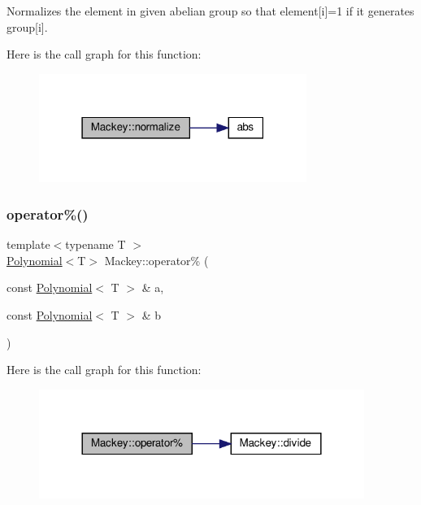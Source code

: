 Normalizes the element in given abelian group so that element\mbox{[}i\mbox{]}=1 if it generates group\mbox{[}i\mbox{]}. 

Here is the call graph for this function\+:\nopagebreak
\begin{figure}[H]
\begin{center}
\leavevmode
\includegraphics[width=247pt]{namespaceMackey_aa3ee3f5d387e24122f0e2865f742675f_cgraph}
\end{center}
\end{figure}
\mbox{\label{namespaceMackey_adb145e729d40138080b5a58d26a89388}} 
\subsubsection{\texorpdfstring{operator\%()}{operator\%()}}
{\footnotesize\ttfamily template$<$typename T $>$ \\
\hyperlink{classMackey_1_1Polynomial}{Polynomial}$<$T$>$ Mackey\+::operator\% (\begin{DoxyParamCaption}\item[{const \hyperlink{classMackey_1_1Polynomial}{Polynomial}$<$ T $>$ \&}]{a,  }\item[{const \hyperlink{classMackey_1_1Polynomial}{Polynomial}$<$ T $>$ \&}]{b }\end{DoxyParamCaption})}

Here is the call graph for this function\+:\nopagebreak
\begin{figure}[H]
\begin{center}
\leavevmode
\includegraphics[width=300pt]{namespaceMackey_adb145e729d40138080b5a58d26a89388_cgraph}
\end{center}
\end{figure}
\mbox{\label{namespaceMackey_a7bbd83e8170a608aea65f7d916b4bc6d}} 
